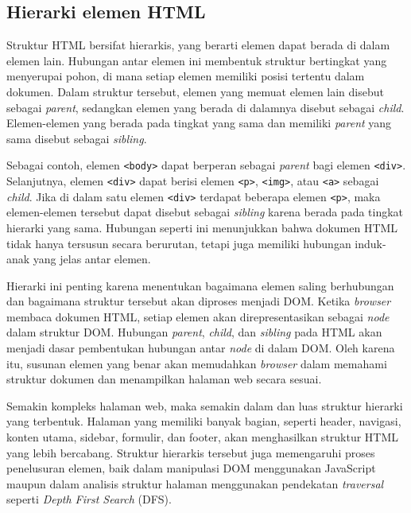 \subsection{Hierarki elemen HTML}

Struktur HTML bersifat hierarkis, yang berarti elemen dapat berada di dalam elemen lain. Hubungan antar elemen ini membentuk struktur bertingkat yang menyerupai pohon, di mana setiap elemen memiliki posisi tertentu dalam dokumen. Dalam struktur tersebut, elemen yang memuat elemen lain disebut sebagai \textit{parent}, sedangkan elemen yang berada di dalamnya disebut sebagai \textit{child}. Elemen-elemen yang berada pada tingkat yang sama dan memiliki \textit{parent} yang sama disebut sebagai \textit{sibling}.

Sebagai contoh, elemen \texttt{<body>} dapat berperan sebagai \textit{parent} bagi elemen \texttt{<div>}. Selanjutnya, elemen \texttt{<div>} dapat berisi elemen \texttt{<p>}, \texttt{<img>}, atau \texttt{<a>} sebagai \textit{child}. Jika di dalam satu elemen \texttt{<div>} terdapat beberapa elemen \texttt{<p>}, maka elemen-elemen tersebut dapat disebut sebagai \textit{sibling} karena berada pada tingkat hierarki yang sama. Hubungan seperti ini menunjukkan bahwa dokumen HTML tidak hanya tersusun secara berurutan, tetapi juga memiliki hubungan induk-anak yang jelas antar elemen.

Hierarki ini penting karena menentukan bagaimana elemen saling berhubungan dan bagaimana struktur tersebut akan diproses menjadi DOM. Ketika \textit{browser} membaca dokumen HTML, setiap elemen akan direpresentasikan sebagai \textit{node} dalam struktur DOM. Hubungan \textit{parent}, \textit{child}, dan \textit{sibling} pada HTML akan menjadi dasar pembentukan hubungan antar \textit{node} di dalam DOM. Oleh karena itu, susunan elemen yang benar akan memudahkan \textit{browser} dalam memahami struktur dokumen dan menampilkan halaman web secara sesuai.

Semakin kompleks halaman web, maka semakin dalam dan luas struktur hierarki yang terbentuk. Halaman yang memiliki banyak bagian, seperti header, navigasi, konten utama, sidebar, formulir, dan footer, akan menghasilkan struktur HTML yang lebih bercabang. Struktur hierarkis tersebut juga memengaruhi proses penelusuran elemen, baik dalam manipulasi DOM menggunakan JavaScript maupun dalam analisis struktur halaman menggunakan pendekatan \textit{traversal} seperti \textit{Depth First Search} (DFS).



